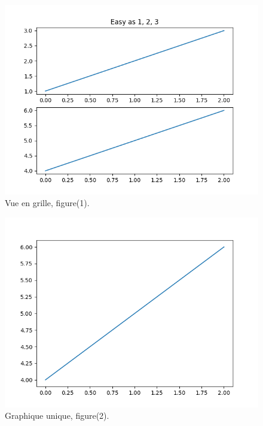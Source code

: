 \documentclass[%
oneside,                 %
final,                   %
10pt,french]{article}
\begin{document}
\begin{figure}[!ht]  %
  \centerline{\includegraphics[width=0.7\linewidth]{imgs/subplot1.png}}
  \caption{
  Vue en grille, figure(1). \label{fig:subplot1}
  }
\end{figure}



\begin{figure}[!ht]  %
  \centerline{\includegraphics[width=0.7\linewidth]{imgs/subplot2.png}}
  \caption{
  Graphique unique, figure(2). \label{fig:subplot2}
  }
\end{figure}
\end{document}
